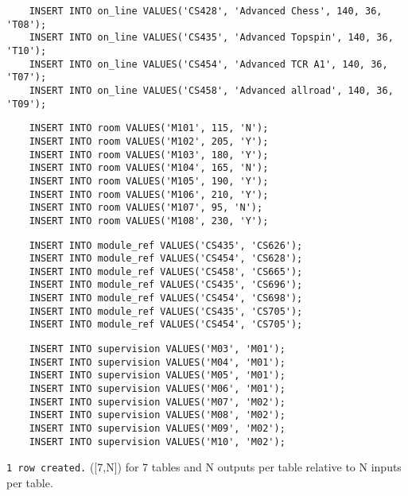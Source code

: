 \documentclass[11pt, english]{article}
\begin{document}
	{\scriptsize\begin{verbatim}
	INSERT INTO on_line VALUES('CS428', 'Advanced Chess', 140, 36, 'T08');
	INSERT INTO on_line VALUES('CS435', 'Advanced Topspin', 140, 36, 'T10');
	INSERT INTO on_line VALUES('CS454', 'Advanced TCR A1', 140, 36, 'T07');
	INSERT INTO on_line VALUES('CS458', 'Advanced allroad', 140, 36, 'T09');
	\end{verbatim}}

	{\scriptsize\begin{verbatim}
	INSERT INTO room VALUES('M101', 115, 'N');
	INSERT INTO room VALUES('M102', 205, 'Y');
	INSERT INTO room VALUES('M103', 180, 'Y');
	INSERT INTO room VALUES('M104', 165, 'N');
	INSERT INTO room VALUES('M105', 190, 'Y');
	INSERT INTO room VALUES('M106', 210, 'Y');
	INSERT INTO room VALUES('M107', 95, 'N');
	INSERT INTO room VALUES('M108', 230, 'Y');
	\end{verbatim}}

	{\scriptsize\begin{verbatim}
	INSERT INTO module_ref VALUES('CS435', 'CS626');
	INSERT INTO module_ref VALUES('CS454', 'CS628');
	INSERT INTO module_ref VALUES('CS458', 'CS665');
	INSERT INTO module_ref VALUES('CS435', 'CS696');
	INSERT INTO module_ref VALUES('CS454', 'CS698');
	INSERT INTO module_ref VALUES('CS435', 'CS705');
	INSERT INTO module_ref VALUES('CS454', 'CS705');
	\end{verbatim}}

	{\scriptsize\begin{verbatim}
	INSERT INTO supervision VALUES('M03', 'M01');
	INSERT INTO supervision VALUES('M04', 'M01');
	INSERT INTO supervision VALUES('M05', 'M01');
	INSERT INTO supervision VALUES('M06', 'M01');
	INSERT INTO supervision VALUES('M07', 'M02');
	INSERT INTO supervision VALUES('M08', 'M02');
	INSERT INTO supervision VALUES('M09', 'M02');
	INSERT INTO supervision VALUES('M10', 'M02');
	\end{verbatim}}

	\texttt{1 row created.} ([7,N]) for 7 tables and N outputs per table relative to N inputs per table.
\end{document}
